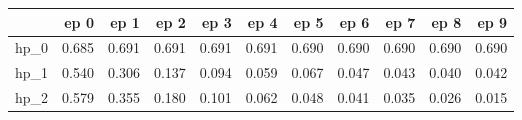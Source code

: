 \begin{tabular}{lrrrrrrrrrr}
\toprule
{} &   ep 0 &   ep 1 &   ep 2 &   ep 3 &   ep 4 &   ep 5 &   ep 6 &   ep 7 &   ep 8 &   ep 9 \\
\midrule
hp\_0 &  0.685 &  0.691 &  0.691 &  0.691 &  0.691 &  0.690 &  0.690 &  0.690 &  0.690 &  0.690 \\
hp\_1 &  0.540 &  0.306 &  0.137 &  0.094 &  0.059 &  0.067 &  0.047 &  0.043 &  0.040 &  0.042 \\
hp\_2 &  0.579 &  0.355 &  0.180 &  0.101 &  0.062 &  0.048 &  0.041 &  0.035 &  0.026 &  0.015 \\
\bottomrule
\end{tabular}
